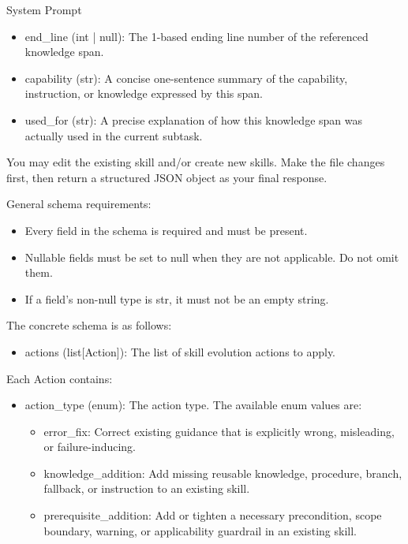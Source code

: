 \documentclass{llmxive}
\providecommand{\svpromptheading}[1]{\par\smallskip\noindent{\sffamily\bfseries#1}\par}
\providecommand{\svinlinecode}[1]{{\ttfamily #1}}
\begin{document}
\begin{svpromptbox}{System Prompt}
\begin{itemize}
\item \svinlinecode{end\_line} (\svinlinecode{int | null}): The 1-based ending line number of the referenced knowledge span.
\item \svinlinecode{capability} (\svinlinecode{str}): A concise one-sentence summary of the capability, instruction, or knowledge expressed by this span.
\item \svinlinecode{used\_for} (\svinlinecode{str}): A precise explanation of how this knowledge span was actually used in the current subtask.
\end{itemize}
\smallskip
\svpromptheading{Output}
\smallskip
You may edit the existing skill and/or create new skills. Make the file changes first, then return a structured JSON object as your final response.\par
\smallskip
General schema requirements:\par
\smallskip
\begin{itemize}
\item Every field in the schema is required and must be present.
\item Nullable fields must be set to \svinlinecode{null} when they are not applicable. Do not omit them.
\item If a field's non-null type is \svinlinecode{str}, it must not be an empty string.
\end{itemize}
\smallskip
The concrete schema is as follows:\par
\smallskip
\begin{itemize}
\item \svinlinecode{actions} (\svinlinecode{list[Action]}): The list of skill evolution actions to apply.
\end{itemize}
\smallskip
Each \svinlinecode{Action} contains:\par
\smallskip
\begin{itemize}
\item \svinlinecode{action\_type} (\svinlinecode{enum}): The action type. The available enum values are:
\begin{itemize}
\item \svinlinecode{error\_fix}: Correct existing guidance that is explicitly wrong, misleading, or failure-inducing.
\item \svinlinecode{knowledge\_addition}: Add missing reusable knowledge, procedure, branch, fallback, or instruction to an existing skill.
\item \svinlinecode{prerequisite\_addition}: Add or tighten a necessary precondition, scope boundary, warning, or applicability guardrail in an existing skill.

\end{itemize}
\end{itemize}
\end{svpromptbox}
\end{document}
